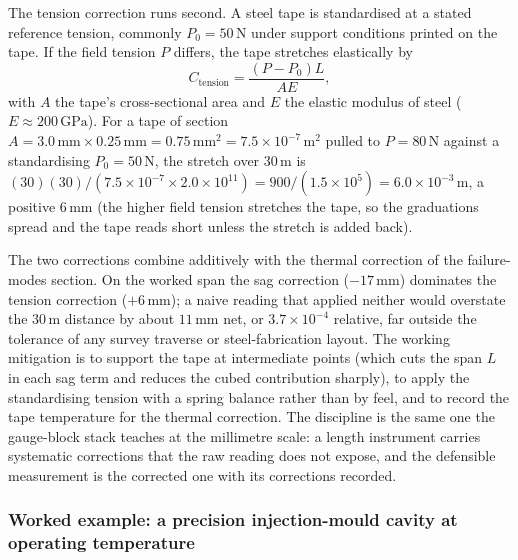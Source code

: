The tension correction runs second. A steel tape is standardised at
a stated reference tension, commonly $P_{0} = 50 \,\si{\newton}$
under support conditions printed on the tape. If the field tension
$P$ differs, the tape stretches elastically by
\[
C_{\mathrm{tension}} = \frac{(P - P_{0}) L}{A E},
\]
with $A$ the tape's cross-sectional area and $E$ the elastic modulus
of steel ($E \approx 200 \,\text{GPa}$). For a tape of section
$A = 3.0 \,\si{\milli\meter} \times 0.25 \,\si{\milli\meter} =
0.75 \,\si{\milli\meter\squared} = 7.5 \times 10^{-7} \,\si{\meter
\squared}$ pulled to $P = 80 \,\si{\newton}$ against a standardising
$P_{0} = 50 \,\si{\newton}$, the stretch over $30 \,\si{\meter}$ is
$(30)(30)/(7.5 \times 10^{-7} \times 2.0 \times 10^{11}) = 900 /
(1.5 \times 10^{5}) = 6.0 \times 10^{-3} \,\si{\meter}$, a positive
$6 \,\si{\milli\meter}$ (the higher field tension stretches the tape,
so the graduations spread and the tape reads short unless the stretch
is added back).

The two corrections combine additively with the thermal correction
of the failure-modes section. On the worked span the sag correction
($-17 \,\si{\milli\meter}$) dominates the tension correction
($+6 \,\si{\milli\meter}$); a naive reading that applied neither
would overstate the $30 \,\si{\meter}$ distance by about
$11 \,\si{\milli\meter}$ net, or $3.7 \times 10^{-4}$ relative, far
outside the tolerance of any survey traverse or steel-fabrication
layout. The working mitigation is to support the tape at intermediate
points (which cuts the span $L$ in each sag term and reduces the
cubed contribution sharply), to apply the standardising tension with
a spring balance rather than by feel, and to record the tape
temperature for the thermal correction. The discipline is the same
one the gauge-block stack teaches at the millimetre scale: a length
instrument carries systematic corrections that the raw reading does
not expose, and the defensible measurement is the corrected one with
its corrections recorded.

\subsubsection*{Worked example: a precision injection-mould cavity at
operating temperature}

